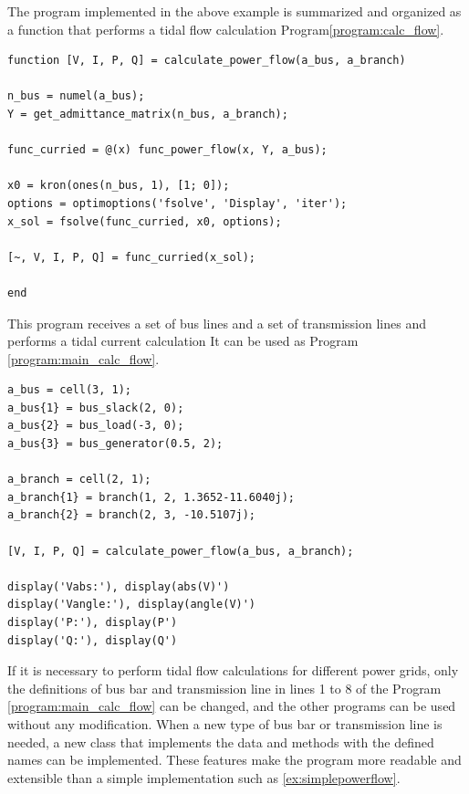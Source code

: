 \documentclass[tombow,dvipdfmx]{corona-a5-1.1}
\begin{document}
\begin{例}
The program implemented in the above example is summarized and organized as a function that performs a tidal flow calculation Program\nobreak\ref{program:calc_flow}.

\smallskip
\begin{PROGRAMA}[count,title={calculate\_power\_flow.m}]\label{program:calc_flow}
\begin{verbatim}
function [V, I, P, Q] = calculate_power_flow(a_bus, a_branch)

n_bus = numel(a_bus);
Y = get_admittance_matrix(n_bus, a_branch);

func_curried = @(x) func_power_flow(x, Y, a_bus);

x0 = kron(ones(n_bus, 1), [1; 0]);
options = optimoptions('fsolve', 'Display', 'iter');
x_sol = fsolve(func_curried, x0, options);

[~, V, I, P, Q] = func_curried(x_sol);

end
\end{verbatim}
\end{PROGRAMA}

This program receives a set of bus lines and a set of transmission lines and performs a tidal current calculation It can be used as Program \nobreak\ref{program:main_calc_flow}.

\smallskip
\begin{PROGRAMA}[count,title={main\_power\_flow.m}]\label{program:main_calc_flow}
\begin{verbatim}
a_bus = cell(3, 1);
a_bus{1} = bus_slack(2, 0);
a_bus{2} = bus_load(-3, 0);
a_bus{3} = bus_generator(0.5, 2);

a_branch = cell(2, 1);
a_branch{1} = branch(1, 2, 1.3652-11.6040j);
a_branch{2} = branch(2, 3, -10.5107j);

[V, I, P, Q] = calculate_power_flow(a_bus, a_branch);

display('Vabs:'), display(abs(V)')
display('Vangle:'), display(angle(V)')
display('P:'), display(P')
display('Q:'), display(Q')
\end{verbatim}
\end{PROGRAMA}

If it is necessary to perform tidal flow calculations for different power grids, only the definitions of bus bar and transmission line in lines 1 to 8 of the Program \nobreak\ref{program:main_calc_flow} can be changed, and the other programs can be used without any modification.
When a new type of bus bar or transmission line is needed, a new class that implements the data and methods with the defined names can be implemented.
These features make the program more readable and extensible than a simple implementation such as \ref{ex:simplepowerflow}.
\end{例}
\end{document}
